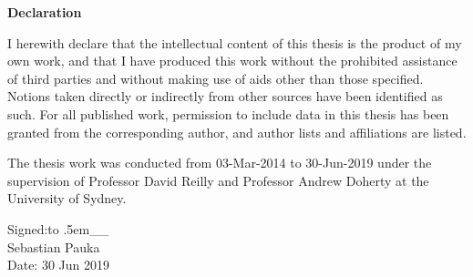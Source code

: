 {}

\bgroup
\LARGE \bf \centering Declaration \\
\egroup

\begin{center}
\begin{minipage}[c]{0.75\textwidth}
\begin{onehalfspace}
    \vspace{2em}
    I herewith declare that the intellectual content of this thesis is the product of my own work, and that I have produced this work without the prohibited assistance of third parties and without making use of aids other than those specified. Notions taken directly or indirectly from other sources have been identified as such. For all published work, permission to include data in this thesis has been granted from the corresponding author, and author lists and affiliations are listed.

    \vspace{1em}
    The thesis work was conducted from 03-Mar-2014 to 30-Jun-2019 under the supervision of Professor David Reilly and Professor Andrew Doherty at the University of Sydney.

    \def\dashsign{\xleaders\hbox to .5em{\_}\hfill\_}
    \vspace{5em}
    \hspace*{0mm}Signed:\vspace{2pt}\dashsign\\
    \hspace*{0mm}\phantom{Signed: }Sebastian Pauka\\
    \hspace*{0mm}\phantom{Signed: }Date: 30 Jun 2019
\end{onehalfspace}
\end{minipage}
\end{center}
